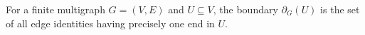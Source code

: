 \begin{definition}
For a finite multigraph $G=(V,E)$ and $U\subseteq V$, the boundary
$\partial_G(U)$ is the set of all edge identities having precisely one end
in $U$.
\end{definition}
